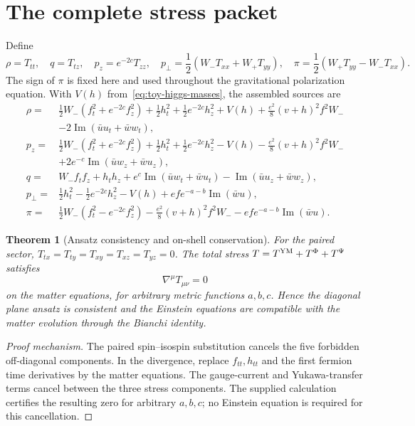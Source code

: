 \documentclass[11pt,a4paper,oneside]{book}
\theoremstyle{plain}
\newtheorem{theorem}{Theorem}[chapter]
\theoremstyle{definition}
\theoremstyle{remark}
\newcommand{\src}[2]{\cite{#1}}
\begin{document}
\section{The complete stress packet}
Define
\begin{equation}
 \rho=T_{tt},\quad q=T_{tz},\quad p_z=e^{-2c}T_{zz},\quad
 p_\perp=\frac12(W_-T_{xx}+W_+T_{yy}),\quad
 \pi=\frac12(W_+T_{yy}-W_-T_{xx}).
 \label{eq:stress-convention}
\end{equation}
The sign of $\pi$ is fixed here and used throughout the gravitational polarization equation. With $V(h)$ from~\eqref{eq:toy-higgs-masses}, the assembled sources are
\begin{align}
 \rho={}&\frac12W_-(f_t^2+e^{-2c}f_z^2)
 +\frac12h_t^2+\frac12e^{-2c}h_z^2+V(h)
 +\frac{e^2}{8}(v+h)^2f^2W_-\nonumber\\
 &-2\operatorname{Im}(\bar uu_t+\bar ww_t),\label{eq:rho}\\
 p_z={}&\frac12W_-(f_t^2+e^{-2c}f_z^2)
 +\frac12h_t^2+\frac12e^{-2c}h_z^2-V(h)
 -\frac{e^2}{8}(v+h)^2f^2W_-\nonumber\\
 &+2e^{-c}\operatorname{Im}(\bar uw_z+\bar wu_z),\label{eq:pz}\\
 q={}&W_-f_tf_z+h_th_z
 +e^c\operatorname{Im}(\bar uw_t+\bar wu_t)
 -\operatorname{Im}(\bar uu_z+\bar ww_z),\label{eq:q}\\
 p_\perp={}&\frac12h_t^2-\frac12e^{-2c}h_z^2-V(h)
 +ef e^{-a-b}\operatorname{Im}(\bar wu),\label{eq:pperp}\\
 \pi={}&\frac12W_-(f_t^2-e^{-2c}f_z^2)
 -\frac{e^2}{8}(v+h)^2f^2W_-
 -ef e^{-a-b}\operatorname{Im}(\bar wu).\label{eq:pi}
\end{align}
\src{R20}{thm:v20v24-einstein}

\begin{theorem}[Ansatz consistency and on-shell conservation]
\label{thm:toy-conservation}
For the paired sector, $T_{tx}=T_{ty}=T_{xy}=T_{xz}=T_{yz}=0$. The total stress $T=T^{\rm YM}+T^\Phi+T^\Psi$ satisfies
\begin{equation}
 \nabla^\mu T_{\mu\nu}=0
\end{equation}
on the matter equations, for arbitrary metric functions $a,b,c$. Hence the diagonal plane ansatz is consistent and the Einstein equations are compatible with the matter evolution through the Bianchi identity.
\end{theorem}
\begin{proof}[Proof mechanism]
The paired spin--isospin substitution cancels the five forbidden off-diagonal components. In the divergence, replace $f_{tt},h_{tt}$ and the first fermion time derivatives by the matter equations. The gauge-current and Yukawa-transfer terms cancel between the three stress components. The supplied calculation certifies the resulting zero for arbitrary $a,b,c$; no Einstein equation is required for this cancellation.
\end{proof}
\src{R20}{thm:v20v24-stress}
\end{document}

